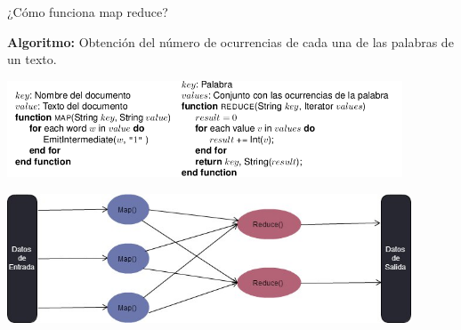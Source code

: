 		\begin{frame}{¿Cómo funciona map reduce?}
			
			\fontsize{7}{8}\selectfont	
			\centering
			
			\noindent\makebox[\linewidth]{\rule{\textwidth}{0.4pt}}			
			\textbf{Algoritmo:} Obtención del número de ocurrencias de cada una de las palabras de un texto.
			\noindent\makebox[\linewidth]{\rule{\textwidth}{0.4pt}}

			\kern2mm					
			\includegraphics[width=0.88\textwidth]{./Images/count-words.png}		


			\noindent\makebox[\linewidth]{\rule{\textwidth}{0.4pt}}

			\kern2mm					
			\includegraphics[width=0.9\textwidth]{./Images/MapReduce.jpg}
		\end{frame}



